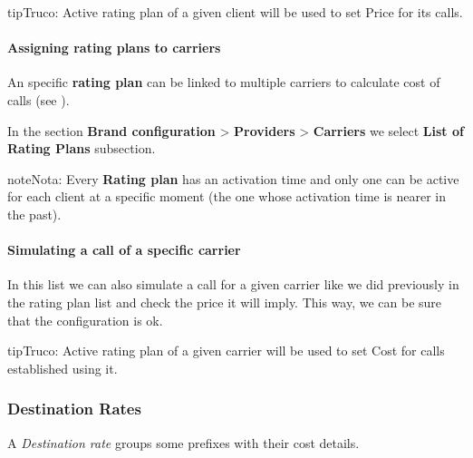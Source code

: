 \documentclass[letterpaper,10pt,spanish]{sphinxmanual}
\begin{document}
\begin{notice}{tip}{Truco:}
Active rating plan of a given client will be used to set Price for its calls.
\end{notice}


\paragraph{Assigning rating plans to carriers}
\label{administration_portal/brand/billing/rating_plans:assigning-rating-plans-to-carriers}\label{administration_portal/brand/billing/rating_plans:id3}
An specific \textbf{rating plan} can be linked to multiple carriers to calculate cost of calls (see {\hyperref[administration_portal/brand/providers/carriers:cost\string-calculation]{}}).

In the section \textbf{Brand configuration} \textgreater{} \textbf{Providers} \textgreater{} \textbf{Carriers} we select \textbf{List of Rating Plans} subsection.

\begin{notice}{note}{Nota:}
Every \textbf{Rating plan} has an activation time and only one can be active for each
client at a specific moment (the one whose activation time is nearer in the past).
\end{notice}
\paragraph{Simulating a call of a specific carrier}

In this list we can also simulate a call for a given carrier like we did previously
in the rating plan list and check the price it will imply. This way, we can be sure
that the configuration is ok.

\begin{notice}{tip}{Truco:}
Active rating plan of a given carrier will be used to set Cost for calls established using it.
\end{notice}


\subsubsection{Destination Rates}
\label{administration_portal/brand/billing/destination_rates:id1}\label{administration_portal/brand/billing/destination_rates::doc}\label{administration_portal/brand/billing/destination_rates:destination-rates}
A \emph{Destination rate} groups some prefixes with their cost details.
\end{document}
